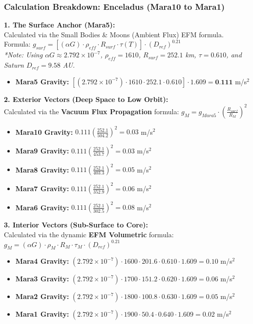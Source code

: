 \documentclass[11pt, a4paper]{article}
\begin{document}
\clearpage
\subsubsection{Calculation Breakdown: Enceladus (Mara10 to Mara1)}

\noindent \textbf{1. The Surface Anchor (Mara5):} \\
Calculated via the Small Bodies \& Moons (Ambient Flux) EFM formula. \\
Formula: $g_{surf} = \left[ (\alpha G) \cdot \rho_{eff} \cdot R_{surf} \cdot \tau(T) \right] \cdot (D_{ref})^{0.21}$ \\
\textit{*Note: Using $\alpha G \approx 2.792 \times 10^{-7}$, $\rho_{eff} = 1610$, $R_{surf} = 252.1$ km, $\tau = 0.610$, and Saturn $D_{ref} = 9.58$ AU.}
\begin{itemize}
  \item \textbf{Mara5 Gravity:} $\left[ (2.792 \times 10^{-7}) \cdot 1610 \cdot 252.1 \cdot 0.610 \right] \cdot 1.609 = \textbf{0.111}$ m/s$^2$
\end{itemize}

\vspace{0.5em}
\noindent \textbf{2. Exterior Vectors (Deep Space to Low Orbit):} \\
Calculated via the \textbf{Vacuum Flux Propagation} formula: $g_M = g_{Mara5} \cdot \left( \frac{R_{surf}}{R_M} \right)^2$
\begin{itemize}
  \item \textbf{Mara10 Gravity:} $0.111 \left( \frac{252.1}{504.2} \right)^2 = 0.03$ m/s$^2$
  \item \textbf{Mara9 Gravity:} $0.111 \left( \frac{252.1}{453.7} \right)^2 = 0.03$ m/s$^2$
  \item \textbf{Mara8 Gravity:} $0.111 \left( \frac{252.1}{403.3} \right)^2 = 0.05$ m/s$^2$
  \item \textbf{Mara7 Gravity:} $0.111 \left( \frac{252.1}{352.9} \right)^2 = 0.06$ m/s$^2$
  \item \textbf{Mara6 Gravity:} $0.111 \left( \frac{252.1}{302.5} \right)^2 = 0.08$ m/s$^2$
\end{itemize}

\vspace{0.5em}
\noindent \textbf{3. Interior Vectors (Sub-Surface to Core):} \\
Calculated via the dynamic \textbf{EFM Volumetric} formula: $g_M = (\alpha G) \cdot \rho_{M} \cdot R_M \cdot \tau_M \cdot (D_{ref})^{0.21}$
\begin{itemize}
  \item \textbf{Mara4 Gravity:} $(2.792 \times 10^{-7}) \cdot 1600 \cdot 201.6 \cdot 0.610 \cdot 1.609 = 0.10$ m/s$^2$
  \item \textbf{Mara3 Gravity:} $(2.792 \times 10^{-7}) \cdot 1700 \cdot 151.2 \cdot 0.620 \cdot 1.609 = 0.06$ m/s$^2$
  \item \textbf{Mara2 Gravity:} $(2.792 \times 10^{-7}) \cdot 1800 \cdot 100.8 \cdot 0.630 \cdot 1.609 = 0.05$ m/s$^2$
  \item \textbf{Mara1 Gravity:} $(2.792 \times 10^{-7}) \cdot 1900 \cdot 50.4 \cdot 0.640 \cdot 1.609 = 0.02$ m/s$^2$
\end{itemize}
\end{document}
